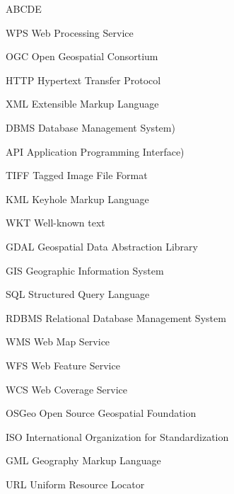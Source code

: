 
\begin{seznamzkratek}{ABCDE}
	      
	     {WPS}
	     {Web Processing Service}	  
	     
	      {OGC}
	      {Open Geospatial Consortium}
	      
	      {HTTP}
	      {Hypertext Transfer Protocol}	         
	      
		  {XML}
	      {Extensible Markup Language}

	      {DBMS}
	      {Database Management System)}
	         
	      {API}
	      {Application Programming Interface)}
	           
	      {TIFF}
	      {Tagged Image File Format}

	      {KML}
	      {Keyhole Markup Language}
	      
	      {WKT}
	      {Well-known text}	      
	      
	      {GDAL}
	      {Geospatial Data Abstraction Library}
	    
	      {GIS}
	      {Geographic Information System}
	     
	      {SQL}
	      {Structured Query Language}
	            
	      {RDBMS}
	      {Relational Database Management System}	
	      
	      {WMS}
	      {Web Map Service}	
	      
	      {WFS}
	      {Web Feature Service}     
	      
	      {WCS}
	      {Web Coverage Service}
	      	      
	      {OSGeo}
	      {Open Source Geospatial Foundation} 	  
	     	  
	      {ISO}
	      {International Organization for Standardization}
	     	  	  
	      {GML}
	      {Geography Markup Language}
	      	     	  	  
	      {URL}
	      {Uniform Resource Locator}
	     	       
	      	            	      

\end{seznamzkratek}